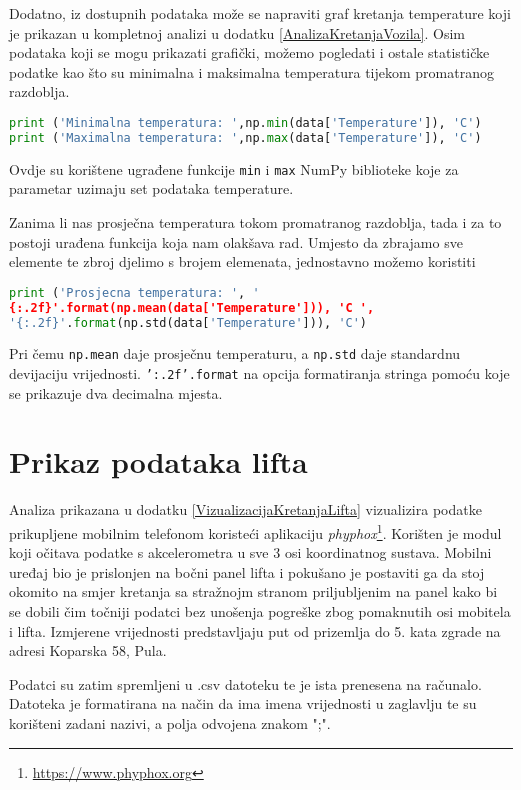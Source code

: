 Dodatno, iz dostupnih podataka može se napraviti graf kretanja temperature koji je prikazan u kompletnoj analizi u dodatku \ref{AnalizaKretanjaVozila}.
Osim podataka koji se mogu prikazati grafički, možemo pogledati i ostale statističke podatke kao što su minimalna i maksimalna temperatura tijekom promatranog razdoblja.
\begin{lstlisting}[language=Python]
print ('Minimalna temperatura: ',np.min(data['Temperature']), 'C')
print ('Maximalna temperatura: ',np.max(data['Temperature']), 'C')
\end{lstlisting}
Ovdje su korištene ugrađene funkcije \texttt{min} i \texttt{max} NumPy biblioteke koje za parametar uzimaju set podataka temperature.

Zanima li nas prosječna temperatura tokom promatranog razdoblja, tada i za to postoji urađena funkcija koja nam olakšava rad.
Umjesto da zbrajamo sve elemente te zbroj djelimo s brojem elemenata, jednostavno možemo koristiti
\begin{lstlisting}[language=Python]
print ('Prosjecna temperatura: ', '
{:.2f}'.format(np.mean(data['Temperature'])), 'C ',
'{:.2f}'.format(np.std(data['Temperature'])), 'C')
\end{lstlisting}
Pri čemu \texttt{np.mean} daje prosječnu temperaturu, a \texttt{np.std} daje standardnu devijaciju vrijednosti.
\texttt{'{:.2f}'.format} na opcija formatiranja stringa pomoću koje se prikazuje dva decimalna mjesta.

\section{Prikaz podataka lifta}
Analiza prikazana u dodatku \ref{VizualizacijaKretanjaLifta} vizualizira podatke prikupljene mobilnim telefonom koristeći aplikaciju \textit{phyphox}\footnote{\url{https://www.phyphox.org}}.
Korišten je modul koji očitava podatke s akcelerometra u sve 3 osi koordinatnog sustava.
Mobilni uređaj bio je prislonjen na bočni panel lifta i pokušano je postaviti ga da stoj okomito na smjer kretanja sa stražnojm stranom priljubljenim na panel kako bi se dobili čim točniji podatci bez unošenja pogreške zbog pomaknutih osi mobitela i lifta.
Izmjerene vrijednosti predstavljaju put od prizemlja do 5. kata zgrade na adresi Koparska 58, Pula.

Podatci su zatim spremljeni u .csv datoteku te je ista prenesena na računalo.
Datoteka je formatirana na način da ima imena vrijednosti u zaglavlju te su korišteni zadani nazivi, a polja odvojena znakom ";".